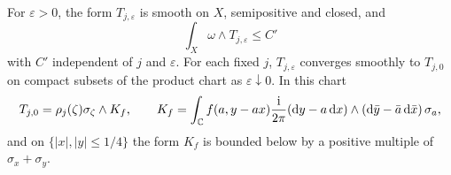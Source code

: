 \begin{lemma}\label{lem:lower-mass-curve-average}
For $\varepsilon>0$, the form $T_{j,\varepsilon}$ is smooth on $X$, semipositive and closed, and
\[
 \int_X\omega\wedge T_{j,\varepsilon}\leq C'
\]
with $C'$ independent of $j$ and $\varepsilon$. For each fixed $j$, $T_{j,\varepsilon}$ converges smoothly to $T_{j,0}$ on compact subsets of the product chart as $\varepsilon\downarrow0$. In this chart
\begin{equation}\label{eq:lower-mass-curve-local}
 T_{j,0}=\rho_j(\zeta)\sigma_\zeta\wedge K_f,\qquad
 K_f=\int_\mathbb C f(a,y-ax)\frac{\mathrm{i}}{2\pi}
       (\mathrm{d}y-a\,\mathrm{d}x)\wedge
       (\mathrm{d}\bar y-\bar a\,\mathrm{d}\bar x)\,\sigma_a,
\end{equation}
and on $\{|x|,|y|\leq1/4\}$ the form $K_f$ is bounded below by a positive multiple of $\sigma_x+\sigma_y$.
\end{lemma}
